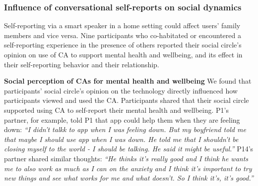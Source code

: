     
            
            
    \subsubsection{Influence of conversational self-reports on social dynamics}
    Self-reporting via a smart speaker in a home setting could affect users' family members and vice versa. 
    Nine participants who co-habitated or encountered a self-reporting experience in the presence of others reported their
        social circle's opinion on use of \ac{CA} to support mental health and wellbeing, and 
        its effect in their self-reporting behavior and their relationship.


        \textbf{Social perception of \acp{CA} for mental health and wellbeing}
            We found that participants' social circle's opinion on the technology directly influenced how participants viewed and used the \ac{CA}.
            Participants shared that their social circle supported using \acl{CA} to self-report their mental health and wellbeing. P1's partner, for example, told P1 that \acl{app} could help them when they are feeling down:
                \textit{``I didn’t talkk to \acl{app} when I was feeling down. But my boyfriend told me that maybe I should use \acl{app} when I was down. 
                He told me that I shouldn’t be closing myself to the world - I should be talking. He said it might be useful.''
                }
            P14's partner shared similar thoughts:
                \textit{``He thinks it's really good and I think he wants me to also work as much as I can on the anxiety and I think it's important to try new things and see what works for me and what doesn't. So I think it's, it's good.''
                }
